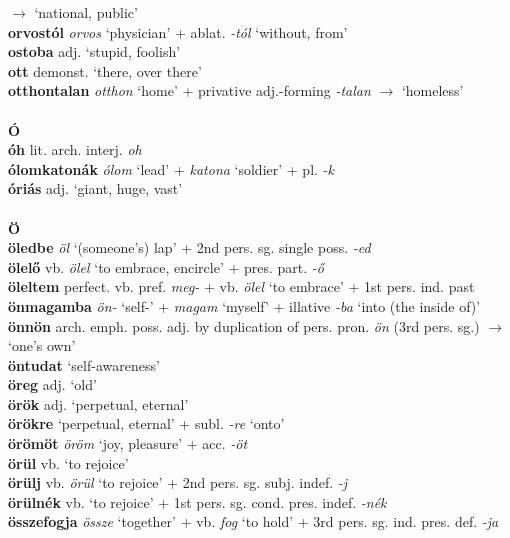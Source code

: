 \documentclass[11pt]{article}
\begin{document}
$\rightarrow$ `national, public' \\
\textbf{orvostól} \emph{orvos} `physician' + ablat. \emph{-tól}
`without, from' \\
\textbf{ostoba} adj. `stupid, foolish' \\
\textbf{ott} demonst. `there, over there' \\
\textbf{otthontalan} \emph{otthon} `home' + privative
adj.\hyp{}forming \emph{-talan} $\rightarrow$ `homeless' \\
\ \\
\noindent \textbf{\large Ó} \\
\textbf{óh} lit. arch. interj. \emph{oh} \\
\textbf{ólomkatonák} \emph{ólom} `lead' + \emph{katona} `soldier' +
pl. \emph{-k} \\
\textbf{óriás} adj. `giant, huge, vast' \\
\ \\
\noindent \textbf{\large Ö} \\
\textbf{öledbe} \emph{öl} `(someone's) lap' + 2nd pers. sg. single
poss. \emph{-ed} \\
\textbf{ölelő} vb. \emph{ölel} `to
embrace, encircle' + pres. part. \emph{-ő} \\
\textbf{öleltem} perfect. vb. pref. \emph{meg-} + vb. \emph{ölel} `to
embrace' + 1st pers. ind. past \\
\textbf{önmagamba} \emph{ön-} `self-' + \emph{magam} `myself' +
illative \emph{-ba} `into (the inside of)' \\
\textbf{önnön} arch. emph. poss. adj. by duplication of
pers. pron. \emph{ön} (3rd pers. sg.) $\rightarrow$ `one's own' \\
\textbf{öntudat} `self-awareness' \\
\textbf{öreg} adj. `old' \\
\textbf{örök} adj. `perpetual, eternal' \\
\textbf{örökre} `perpetual, eternal' + subl. \emph{-re} `onto' \\
\textbf{örömöt} \emph{öröm} `joy, pleasure' + acc. \emph{-öt} \\
\textbf{örül} vb. `to rejoice' \\
\textbf{örülj} vb. \emph{örül} `to rejoice' + 2nd
pers. sg. subj. indef. \emph{-j} \\
\textbf{örülnék} vb. `to rejoice' + 1st
pers. sg. cond. pres. indef. \emph{-nék} \\
\textbf{összefogja} \emph{össze} `together' + vb. \emph{fog}
  `to hold' + 3rd pers. sg. ind. pres. def. \emph{-ja} \\
\end{document}
